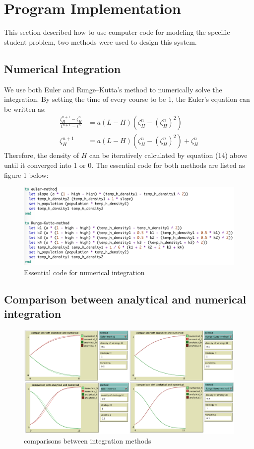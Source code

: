 \documentclass[a4paper, 12pt]{article}
\begin{document}
\section{Program Implementation}
This section described how to use computer code for modeling the specific student problem, two methods were used to design this system. 
\subsection{Numerical Integration}
We use both Euler and Runge–Kutta's method to numerically solve the integration. By setting the time of every course to be 1, the Euler's equation can be written as:
\vspace{-3mm}
\begin{equation}
\begin{split}
	\frac{\zeta_{H}^{n+1}-\zeta_{H}^{n}}{t^{n+1}-t^{n}} & = a(L-H)( \zeta_{H}^{n} - (\zeta_{H}^{n})^{2}) \\
	\zeta_{H}^{n+1} &=  a(L-H)( \zeta_{H}^{n} - (\zeta_{H}^{n})^{2}) + \zeta_{H}^{n}
\end{split}
\end{equation}
Therefore, the density of $H$ can be iteratively calculated by equation (14) above until it converged into 1 or 0. The essential code for both methods are listed as figure 1 below:
\begin{figure}[!h]
  \centering
  \includegraphics[width=6in]{./figures/code}
  \caption{\footnotesize Essential code for numerical integration}
  \label{integrate}
\end{figure}

\subsection{Comparison between analytical and numerical integration} 

\begin{figure}[!h]
  \centering
  \includegraphics[width=6in]{./figures/comp}
  \caption{\footnotesize comparisons between integration methods}
  \label{comparison}
\end{figure}
\end{document}
